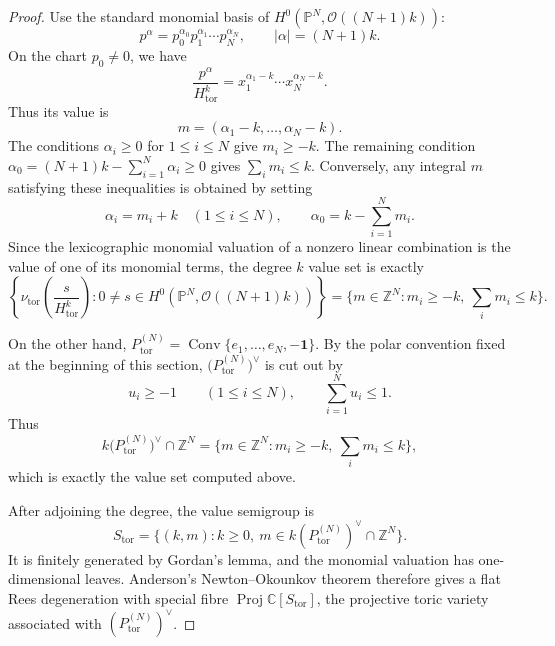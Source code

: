\documentclass{article}
\newcommand{\ZZ}{\mathbb{Z}}
\newcommand{\CC}{\mathbb{C}}
\newcommand{\PP}{\mathbb{P}}
\begin{document}
\begin{proof}
Use the standard monomial basis of \(H^0(\PP^N,\mathcal O((N+1)k))\):
\[
p^\alpha=p_0^{\alpha_0}p_1^{\alpha_1}\cdots p_N^{\alpha_N},
\qquad
|\alpha|=(N+1)k.
\]
On the chart \(p_0\ne0\), we have
\[
\frac{p^\alpha}{H_{\mathrm{tor}}^k}
=
x_1^{\alpha_1-k}\cdots x_N^{\alpha_N-k}.
\]
Thus its value is
\[
m=(\alpha_1-k,\ldots,\alpha_N-k).
\]
The conditions \(\alpha_i\ge0\) for \(1\le i\le N\) give \(m_i\ge-k\). The remaining condition
\(\alpha_0=(N+1)k-\sum_{i=1}^N\alpha_i\ge0\) gives \(\sum_i m_i\le k\). Conversely, any integral \(m\) satisfying these inequalities is obtained by setting
\[
\alpha_i=m_i+k\quad(1\le i\le N),
\qquad
\alpha_0=k-\sum_{i=1}^Nm_i.
\]
Since the lexicographic monomial valuation of a nonzero linear combination is the value of one of its monomial terms, the degree \(k\) value set is exactly
\[
\left\{
\nu_{\mathrm{tor}}\left(\frac{s}{H_{\mathrm{tor}}^k}\right):
0\ne s\in H^0(\PP^N,\mathcal O((N+1)k))
\right\}
=
\{m\in\ZZ^N:m_i\ge-k,\ \sum_i m_i\le k\}.
\]

On the other hand, \(P_{\mathrm{tor}}^{(N)}=\operatorname{Conv}\{e_1,\ldots,e_N,-\mathbf 1\}\). By the polar convention fixed at the beginning of this section, \(\bigl(P_{\mathrm{tor}}^{(N)}\bigr)^\vee\) is cut out by
\[
u_i\ge -1\qquad(1\le i\le N),
\qquad
\sum_{i=1}^Nu_i\le1.
\]
Thus
\[
k\bigl(P_{\mathrm{tor}}^{(N)}\bigr)^\vee\cap\ZZ^N
=
\{m\in\ZZ^N:m_i\ge-k,\ \sum_i m_i\le k\},
\]
which is exactly the value set computed above.

After adjoining the degree, the value semigroup is
\[
S_{\mathrm{tor}}
=
\{(k,m):k\ge0,\ m\in k(P_{\mathrm{tor}}^{(N)})^\vee\cap\ZZ^N\}.
\]
It is finitely generated by Gordan's lemma, and the monomial valuation has one-dimensional leaves. Anderson's Newton--Okounkov theorem therefore gives a flat Rees degeneration with special fibre \(\operatorname{Proj}\CC[S_{\mathrm{tor}}]\), the projective toric variety associated with \((P_{\mathrm{tor}}^{(N)})^\vee\).
\end{proof}
\end{document}
